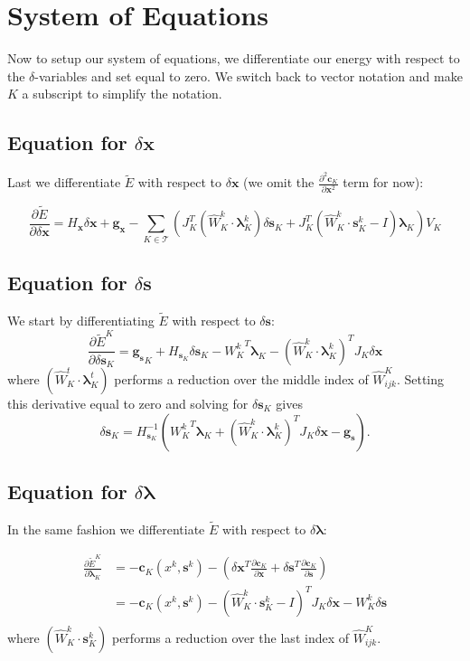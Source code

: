 \documentclass[letterpaper,12pt]{article}
\theoremstyle{remark}
\newcommand{\Th}{\mathcal{T}}
\newcommand{\x}{\mathbf{x}}
\newcommand{\C}{\mathbf{c}}
\newcommand{\s}{\mathbf{s}}
\newcommand{\la}{\mathbf{\lambda}}
\newcommand{\dx}{\delta \x}
\newcommand{\ds}{\delta \s}
\newcommand{\dl}{\delta \la}
\newcommand{\Hx}{ {H_\x} }
\newcommand{\Hsk}{ {H_{\s_K}} }
\newcommand{\Hskinv}{H_{\s_K}^{-1}}
\newcommand{\gx}{ {\mathbf{g}_\x} }
\newcommand{\gs}{ {\mathbf{g}_\s} }
\begin{document}
\section{System of Equations}
Now to setup our system of equations, we differentiate our energy with respect to the $\delta$-variables and set equal to zero. We switch back to vector notation and make $K$ a subscript to simplify the notation.


\subsection{Equation for $\dx$}
Last we differentiate $\tilde{E}$ with respect to $\dx$ (we omit the $\frac{\partial^2 \C_K}{ \partial \x^2}$ term for now):

\begin{equation}
\frac{\partial \tilde{E}}{\partial \dx} = \Hx\dx + \gx 
- \sum_{K \in \Th} \left(
J_K^T(\hat{W}_K^{k}\cdot \la_K^k) \ds_K +
J_K^T(\hat{W}_K^{k}\cdot \s_K^k - I)\la_K
\right)V_K
\end{equation}


\subsection{Equation for $\ds$}
We start by differentiating $\tilde{E}$ with respect to $\ds$:
\begin{equation}
\frac{\partial \tilde{E}^K}{\partial \ds_K} =  \gs_K + \Hsk \ds_K -
{W_K^k}^T \la_K - (\hat{W}_K^{k}\cdot \la_K^k)^T J_K \dx
\end{equation}
where $(\hat{W}_K^{t}\cdot \la_K^t)$ performs a reduction over the middle index of $\hat{W}^K_{ijk}$. Setting this derivative equal to zero and solving for $\ds_K$ gives
\begin{equation}
\ds_K = \Hskinv \left( {W_K^k}^T \la_K + (\hat{W}_K^{k}\cdot \la_K^k)^T J_K \dx - \gs \right).
\end{equation}

\subsection{Equation for $\dl$}
In the same fashion we differentiate $\tilde{E}$ with respect to $\dl$:

\begin{equation}
\begin{split}
\frac{\partial \tilde{E}^K}{\partial \la_K} &= -\C_K (x^k,\s^k)- \left( \dx^T 
  \frac{\partial \C_K }{\partial \x} +  \ds^T \frac{\partial \C_K }{\partial \s} \right) \\
  &= -\C_K (x^k,\s^k) -(\hat{W}_K^{k}\cdot \s_K^k - I)^T J_K \dx - W_K^k \ds\\
\end{split}
\end{equation}
where $(\hat{W}_K^{k}\cdot \s_K^k)$ performs a reduction over the last index of $\hat{W}^K_{ijk}$.
\end{document}
